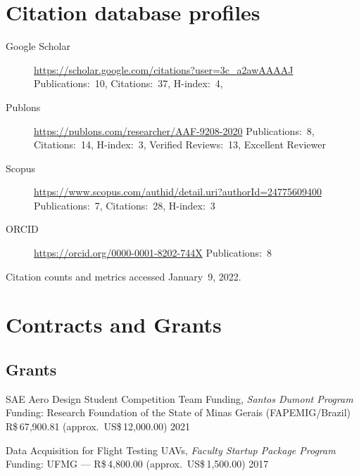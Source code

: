 \documentclass[letterpaper, 11pt, oneside]{memoir}
\begin{document}
\section{Citation database profiles}
\begin{description}
\item[Google Scholar] 
  \url{https://scholar.google.com/citations?user=3c_a2awAAAAJ}\newline
  Publications:~10, Citations:~37, H-index:~4,
\item[Publons]
  \url{https://publons.com/researcher/AAF-9208-2020}\newline
  Publications:~8, Citations:~14, H-index:~3, Verified Reviews:~13, 
  Excellent Reviewer
\item[Scopus]
  \url{https://www.scopus.com/authid/detail.uri?authorId=24775609400}\newline
  Publications:~7, Citations:~28, H-index:~3
\item[ORCID]
  \url{https://orcid.org/0000-0001-8202-744X}\newline
  Publications:~8
\end{description}

\noindent
Citation counts and metrics accessed January~9, 2022.

\section{Contracts and Grants}
\subsection{Grants}
\begin{description} 
\item {SAE Aero Design Student Competition Team Funding,}
\emph{Santos Dumont Program}
{ \newline Funding: 
  Research Foundation of the State of Minas Gerais (FAPEMIG/Brazil)
  \newline
  R\$\,67,900.81 (approx.\ US\$\,12,000.00)
}{}{}
 \hfill {2021}

\item {Data Acquisition for Flight Testing UAVs,}
\emph{Faculty Startup Package Program}
{\newline Funding: UFMG --- R\$\,4,800.00 (approx.\ US\$\,1,500.00)}{}{}
\hfill {2017}
\end{description}
\end{document}
